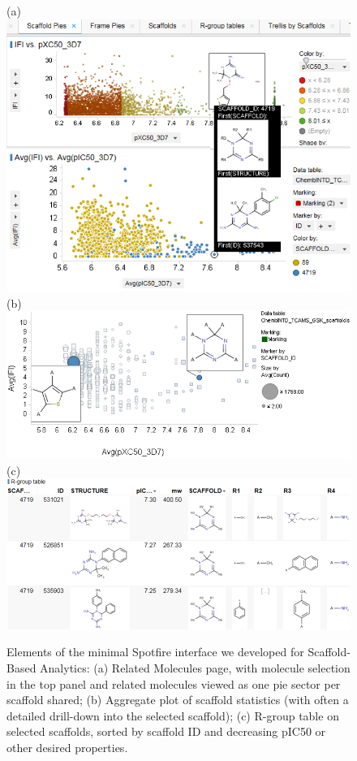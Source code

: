 \documentclass[journal=jacsat,manuscript=article]{achemso}
\begin{document}
\begin{figure}
(a)\includegraphics[width=5in]{fig/spotviz_scafpie_tooltip.png}\\
(b)\includegraphics[width=5in]{fig/spotviz_scaffolds_aggr.png}\\
(c)\includegraphics[width=5in]{fig/spotviz_RGtable.png}
\caption{Elements of the minimal Spotfire interface we developed for Scaffold-Based Analytics: (a) Related Molecules page, with molecule selection in the top panel and related molecules viewed as one pie sector per scaffold shared; (b) Aggregate plot of scaffold statistics (with often a detailed drill-down into the selected scaffold);  (c) R-group table on selected scaffolds, sorted by scaffold ID and decreasing pIC50 or other desired properties.}
 \label{fig:spotviz}
\end{figure}
\end{document}
